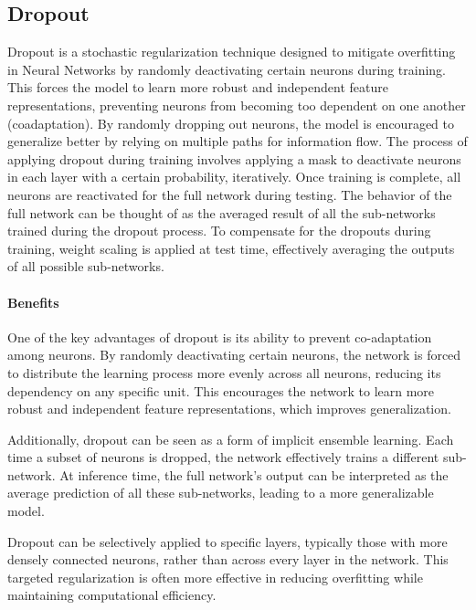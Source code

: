 \subsection{Dropout}
Dropout is a stochastic regularization technique designed to mitigate overfitting in Neural Networks by randomly deactivating certain neurons during training. 
This forces the model to learn more robust and independent feature representations, preventing neurons from becoming too dependent on one another (coadaptation). 
By randomly dropping out neurons, the model is encouraged to generalize better by relying on multiple paths for information flow.
\noindent The process of applying dropout during training involves applying a mask to deactivate neurons in each layer with a certain probability, iteratively. 
Once training is complete, all neurons are reactivated for the full network during testing. 
The behavior of the full network can be thought of as the averaged result of all the sub-networks trained during the dropout process. 
To compensate for the dropouts during training, weight scaling is applied at test time, effectively averaging the outputs of all possible sub-networks.

\paragraph*{Benefits}
One of the key advantages of dropout is its ability to prevent co-adaptation among neurons. 
By randomly deactivating certain neurons, the network is forced to distribute the learning process more evenly across all neurons, reducing its dependency on any specific unit. 
This encourages the network to learn more robust and independent feature representations, which improves generalization.

Additionally, dropout can be seen as a form of implicit ensemble learning. 
Each time a subset of neurons is dropped, the network effectively trains a different sub-network. 
At inference time, the full network's output can be interpreted as the average prediction of all these sub-networks, leading to a more generalizable model.

Dropout can be selectively applied to specific layers, typically those with more densely connected neurons, rather than across every layer in the network. 
This targeted regularization is often more effective in reducing overfitting while maintaining computational efficiency.